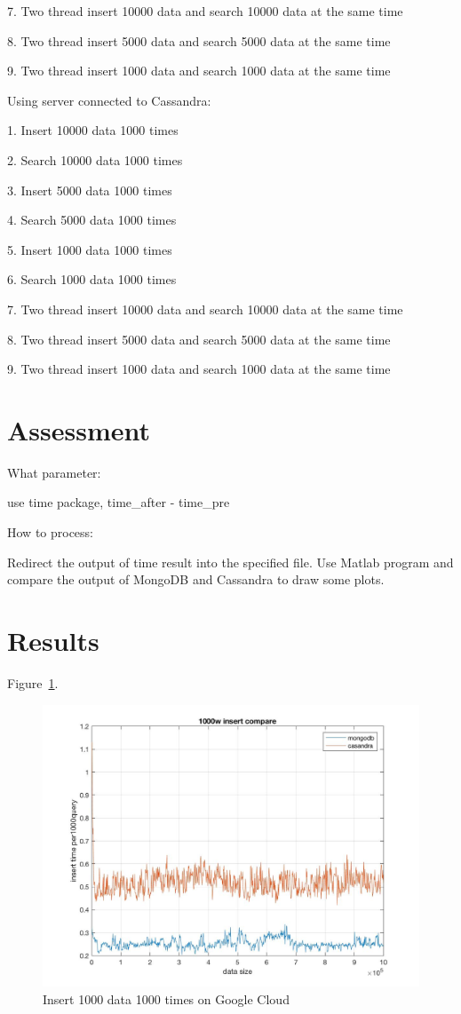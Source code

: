 7. Two thread insert 10000 data and search 10000 data at the same time

8. Two thread insert 5000 data and search 5000 data at the same time

9. Two thread insert 1000 data and search 1000 data at the same time

Using server connected to Cassandra:

1. Insert 10000 data 1000 times

2. Search 10000 data 1000 times

3. Insert 5000 data 1000 times

4. Search 5000 data 1000 times

5. Insert 1000 data 1000 times

6. Search 1000 data 1000 times

7. Two thread insert 10000 data and search 10000 data at the same time

8. Two thread insert 5000 data and search 5000 data at the same time

9. Two thread insert 1000 data and search 1000 data at the same time

\section{Assessment}
What parameter:

use time package, time\_after - time\_pre 

How to process:

Redirect the output of time result into the specified file. Use Matlab program 
and compare the output of MongoDB and Cassandra to draw some plots. 

\section{Results}

Figure~\ref{f:fly}.

\begin{figure}[!ht]
  \centering\includegraphics[width=\columnwidth]{images/insert_comp_1000_google.jpg}
  \caption{Insert 1000 data 1000 times on Google Cloud}\label{f:fly}
\end{figure}

